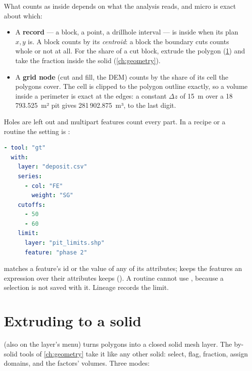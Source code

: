 What counts as inside depends on what the analysis reads, and micro is exact about which:

\begin{itemize}
\item A \textbf{record} --- a block, a point, a drillhole interval --- is inside when its plan $x, y$
  is. A block counts by its \emph{centroid}: a block the boundary cuts counts whole or not at all. For
  the share of a cut block, extrude the polygon (\cref{sec:polygons-extrude}) and take the fraction
  inside the solid (\cref{ch:geometry}).
\item A \textbf{grid node} (cut and fill, the DEM) counts by the share of its cell the polygons cover.
  The cell is clipped to the polygon outline exactly, so a volume inside a perimeter is exact at the
  edges: a constant $\Delta z$ of 15~m over a 18\,793.525~m² pit gives 281\,902.875~m³, to the
  last digit.
\end{itemize}

Holes are left out and multipart features count every part. In a recipe or a routine the setting is
:

\begin{lstlisting}[language=yaml]
- tool: "gt"
  with:
    layer: "deposit.csv"
    series:
      - col: "FE"
        weight: "SG"
    cutoffs:
      - 50
      - 60
    limit:
      layer: "pit_limits.shp"
      feature: "phase 2"
\end{lstlisting}

 matches a feature's id or the value of any of its attributes;  keeps the
features an expression over their attributes keeps (). A routine cannot
use , because a selection is not saved with it. Lineage records the limit.

\section{Extruding to a solid}\label{sec:polygons-extrude}

 (also on the layer's  menu) turns polygons
into a closed solid mesh layer. The by-solid tools of \cref{ch:geometry} take it like any other
solid: select, flag, fraction, assign domains, and the factors' volumes. Three modes:


